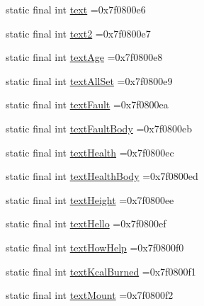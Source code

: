 \begin{DoxyCompactItemize}
\item 
static final int \mbox{\hyperlink{classcom_1_1example_1_1trainawearapplication_1_1_r_1_1id_a0688a958d29c351795293e8a1a6c03e6}{text}} =0x7f0800e6
\item 
static final int \mbox{\hyperlink{classcom_1_1example_1_1trainawearapplication_1_1_r_1_1id_a9b5519b70fdbc0423eb613c33c3292b7}{text2}} =0x7f0800e7
\item 
static final int \mbox{\hyperlink{classcom_1_1example_1_1trainawearapplication_1_1_r_1_1id_ac0bd50fc338aadf7e06b5a0c2d9c1eb7}{text\+Age}} =0x7f0800e8
\item 
static final int \mbox{\hyperlink{classcom_1_1example_1_1trainawearapplication_1_1_r_1_1id_ae43e614e0dd9fb7bb9c3c12e95703f42}{text\+All\+Set}} =0x7f0800e9
\item 
static final int \mbox{\hyperlink{classcom_1_1example_1_1trainawearapplication_1_1_r_1_1id_ae9e26dd69717c6a5c37d4a5cc69f857d}{text\+Fault}} =0x7f0800ea
\item 
static final int \mbox{\hyperlink{classcom_1_1example_1_1trainawearapplication_1_1_r_1_1id_a8efcb79c50eec42c0ddec027f8ed0984}{text\+Fault\+Body}} =0x7f0800eb
\item 
static final int \mbox{\hyperlink{classcom_1_1example_1_1trainawearapplication_1_1_r_1_1id_adafc1383016acb2887c84ec312e2801b}{text\+Health}} =0x7f0800ec
\item 
static final int \mbox{\hyperlink{classcom_1_1example_1_1trainawearapplication_1_1_r_1_1id_a1542d824ad2e63abc7a538ea36e6d4fc}{text\+Health\+Body}} =0x7f0800ed
\item 
static final int \mbox{\hyperlink{classcom_1_1example_1_1trainawearapplication_1_1_r_1_1id_a3de920808c40e2f0cc9dd4eaa047da0f}{text\+Height}} =0x7f0800ee
\item 
static final int \mbox{\hyperlink{classcom_1_1example_1_1trainawearapplication_1_1_r_1_1id_aa8a32a9f226419b373304a943dbc184c}{text\+Hello}} =0x7f0800ef
\item 
static final int \mbox{\hyperlink{classcom_1_1example_1_1trainawearapplication_1_1_r_1_1id_a6ac881550baf841d00e3ae43ab0830ad}{text\+How\+Help}} =0x7f0800f0
\item 
static final int \mbox{\hyperlink{classcom_1_1example_1_1trainawearapplication_1_1_r_1_1id_a81fd086be49da1fca88ddd3cc682b8b8}{text\+Kcal\+Burned}} =0x7f0800f1
\item 
static final int \mbox{\hyperlink{classcom_1_1example_1_1trainawearapplication_1_1_r_1_1id_a2a161306526947c8ddeb237800ab0c33}{text\+Mount}} =0x7f0800f2

\end{DoxyCompactItemize}
